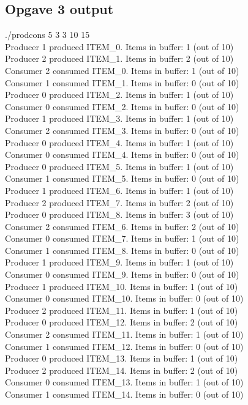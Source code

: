 \subsection{Opgave 3 output}
\label{O3_Output}
./prodcons 5 3 3 10 15
\\Producer 1 produced ITEM\_0. Items in buffer: 1 (out of 10)
\\Producer 2 produced ITEM\_1. Items in buffer: 2 (out of 10)
\\Consumer 2 consumed ITEM\_0. Items in buffer: 1 (out of 10)
\\Consumer 1 consumed ITEM\_1. Items in buffer: 0 (out of 10)
\\Producer 0 produced ITEM\_2. Items in buffer: 1 (out of 10)
\\Consumer 0 consumed ITEM\_2. Items in buffer: 0 (out of 10)
\\Producer 1 produced ITEM\_3. Items in buffer: 1 (out of 10)
\\Consumer 2 consumed ITEM\_3. Items in buffer: 0 (out of 10)
\\Producer 0 produced ITEM\_4. Items in buffer: 1 (out of 10)
\\Consumer 0 consumed ITEM\_4. Items in buffer: 0 (out of 10)
\\Producer 0 produced ITEM\_5. Items in buffer: 1 (out of 10)
\\Consumer 1 consumed ITEM\_5. Items in buffer: 0 (out of 10)
\\Producer 1 produced ITEM\_6. Items in buffer: 1 (out of 10)
\\Producer 2 produced ITEM\_7. Items in buffer: 2 (out of 10)
\\Producer 0 produced ITEM\_8. Items in buffer: 3 (out of 10)
\\Consumer 2 consumed ITEM\_6. Items in buffer: 2 (out of 10)
\\Consumer 0 consumed ITEM\_7. Items in buffer: 1 (out of 10)
\\Consumer 1 consumed ITEM\_8. Items in buffer: 0 (out of 10)
\\Producer 1 produced ITEM\_9. Items in buffer: 1 (out of 10)
\\Consumer 0 consumed ITEM\_9. Items in buffer: 0 (out of 10)
\\Producer 1 produced ITEM\_10. Items in buffer: 1 (out of 10)
\\Consumer 0 consumed ITEM\_10. Items in buffer: 0 (out of 10)
\\Producer 2 produced ITEM\_11. Items in buffer: 1 (out of 10)
\\Producer 0 produced ITEM\_12. Items in buffer: 2 (out of 10)
\\Consumer 2 consumed ITEM\_11. Items in buffer: 1 (out of 10)
\\Consumer 1 consumed ITEM\_12. Items in buffer: 0 (out of 10)
\\Producer 0 produced ITEM\_13. Items in buffer: 1 (out of 10)
\\Producer 2 produced ITEM\_14. Items in buffer: 2 (out of 10)
\\Consumer 0 consumed ITEM\_13. Items in buffer: 1 (out of 10)
\\Consumer 1 consumed ITEM\_14. Items in buffer: 0 (out of 10)